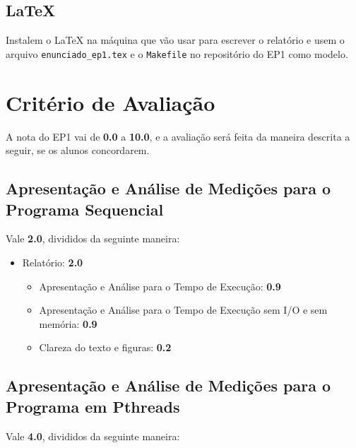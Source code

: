 \documentclass[final,12pt,a4paper]{elsarticle}
\begin{document}
\subsection{\LaTeX}

Instalem o \LaTeX{} na máquina que vão usar para escrever o relatório e usem o
arquivo \texttt{enunciado\_ep1.tex} e o \texttt{Makefile} no repositório do EP1
como modelo.

\section{Critério de Avaliação}

A nota do EP1 vai de \textbf{0.0} a \textbf{10.0}, e a avaliação será feita da
maneira descrita a seguir, se os alunos concordarem.

\subsection{Apresentação e Análise de Medições para o Programa Sequencial}

Vale \textbf{2.0}, divididos da seguinte maneira:

\begin{itemize}
    \item Relatório: \textbf{2.0}
    \begin{itemize}
        \item Apresentação e Análise para o Tempo de Execução: \textbf{0.9}
        \item Apresentação e Análise para o Tempo de Execução sem I/O e sem memória: \textbf{0.9}
        \item Clareza do texto e figuras: \textbf{0.2}
    \end{itemize}
\end{itemize}

\subsection{Apresentação e Análise de Medições para o Programa em Pthreads}

Vale \textbf{4.0}, divididos da seguinte maneira:
\end{document}
